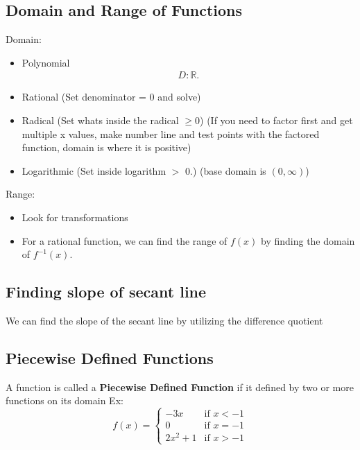 \documentclass{report}
\begin{document}
        \bigbreak \noindent \bigbreak \noindent 
    \subsection{Domain and Range of Functions}
    \bigbreak \noindent \bigbreak \noindent
    Domain:
    \begin{itemize}
        \item Polynomial 
            \begin{align*}
                D: \mathbb{R}
            .\end{align*}
        \item Rational (Set denominator = 0 and solve)
        \item Radical (Set whats inside the radical $\geq 0$) (If you need to factor first and get multiple x values, make number line and test points with the factored function, domain is where it is positive)
        \item Logarithmic (Set inside logarithm $ >$ 0.) (base domain is $(0,\infty)$)
    \end{itemize}
    \bigbreak \noindent \bigbreak \noindent
    \bigbreak \noindent \bigbreak \noindent
    Range:
    \begin{itemize}
      \item Look for transformations
      \item For a rational function, we can find the range of $f(x)$ by finding the domain of $f^{-1}(x)$.
    \end{itemize}

    \pagebreak \bigbreak \noindent
    \subsection{Finding slope of secant line}
    We can find the slope of the secant line by utilizing the difference quotient

    \bigbreak \noindent \bigbreak \noindent
    \subsection{
      Piecewise Defined Functions
    }
    A function is called a \textbf{Piecewise Defined Function} if it defined by two or more functions on its domain
    \bigbreak \noindent 
    Ex:
       \begin{equation}
        f(x)=
            \begin{cases}
                 -3x& \text{if } x < -1 \\
                 0& \text{if }  x = -1\\
                 2x^{2}+1& \text{if } x > -1  
            \end{cases}
        \end{equation}
\end{document}
